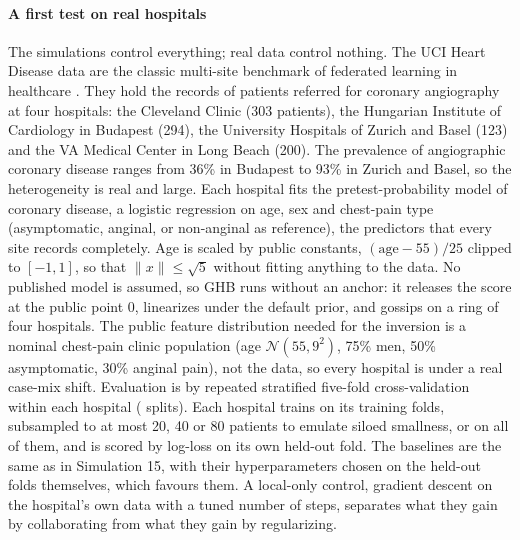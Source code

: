 \paragraph{A first test on real hospitals} The simulations control everything; real data control nothing. The UCI Heart Disease data \cite{detrano1989international} are the classic multi-site benchmark of federated learning in healthcare \cite{ogierduterrail2022flamby}. They hold the records of patients referred for coronary angiography at four hospitals: the Cleveland Clinic (303 patients), the Hungarian Institute of Cardiology in Budapest (294), the University Hospitals of Zurich and Basel (123) and the VA Medical Center in Long Beach (200). The prevalence of angiographic coronary disease ranges from 36\% in Budapest to 93\% in Zurich and Basel, so the heterogeneity is real and large. Each hospital fits the pretest-probability model of coronary disease, a logistic regression on age, sex and chest-pain type (asymptomatic, anginal, or non-anginal as reference), the predictors that every site records completely. Age is scaled by public constants, $(\text{age}-55)/25$ clipped to $[-1,1]$, so that $\|x\|\le\sqrt{5}$ without fitting anything to the data. No published model is assumed, so GHB runs without an anchor: it releases the score at the public point 0, linearizes under the default prior, and gossips on a ring of four hospitals. The public feature distribution needed for the inversion is a nominal chest-pain clinic population (age $\mathcal{N}(55,9^2)$, 75\% men, 50\% asymptomatic, 30\% anginal pain), not the data, so every hospital is under a real case-mix shift. Evaluation is by repeated stratified five-fold cross-validation within each hospital (\SimRealHeartSplits{} splits). Each hospital trains on its training folds, subsampled to at most 20, 40 or 80 patients to emulate siloed smallness, or on all of them, and is scored by log-loss on its own held-out fold. The baselines are the same as in Simulation 15, with their hyperparameters chosen on the held-out folds themselves, which favours them. A local-only control, gradient descent on the hospital's own data with a tuned number of steps, separates what they gain by collaborating from what they gain by regularizing.

